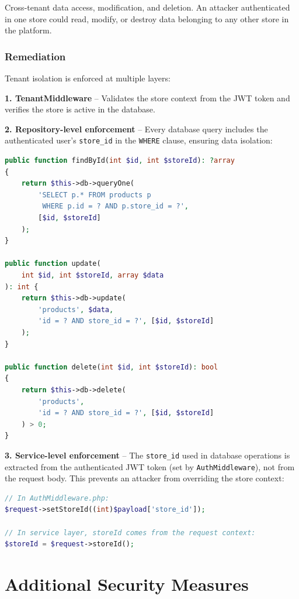 \documentclass[12pt,a4paper]{article}
\begin{document}
Cross-tenant data access, modification, and deletion. An attacker authenticated in one store could read, modify, or destroy data belonging to any other store in the platform.

\subsubsection{Remediation}

Tenant isolation is enforced at multiple layers:

\textbf{1. TenantMiddleware} -- Validates the store context from the JWT token and verifies the store is active in the database.

\textbf{2. Repository-level enforcement} -- Every database query includes the authenticated user's \texttt{store\_id} in the \texttt{WHERE} clause, ensuring data isolation:

\begin{lstlisting}[language=PHP, caption={Tenant-scoped queries in ProductRepository.php}]
public function findById(int $id, int $storeId): ?array
{
    return $this->db->queryOne(
        'SELECT p.* FROM products p
         WHERE p.id = ? AND p.store_id = ?',
        [$id, $storeId]
    );
}

public function update(
    int $id, int $storeId, array $data
): int {
    return $this->db->update(
        'products', $data,
        'id = ? AND store_id = ?', [$id, $storeId]
    );
}

public function delete(int $id, int $storeId): bool
{
    return $this->db->delete(
        'products',
        'id = ? AND store_id = ?', [$id, $storeId]
    ) > 0;
}
\end{lstlisting}

\textbf{3. Service-level enforcement} -- The \texttt{store\_id} used in database operations is extracted from the authenticated JWT token (set by \texttt{AuthMiddleware}), not from the request body. This prevents an attacker from overriding the store context:

\begin{lstlisting}[language=PHP, caption={Store ID from JWT, not from user input}]
// In AuthMiddleware.php:
$request->setStoreId((int)$payload['store_id']);

// In service layer, storeId comes from the request context:
$storeId = $request->storeId();
\end{lstlisting}

\section{Additional Security Measures}
\end{document}

